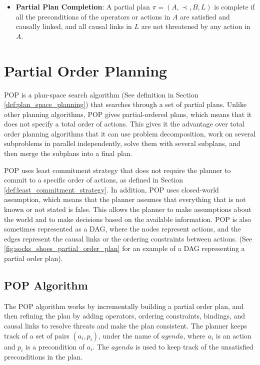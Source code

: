 \begin{itemize}
      \item  \label{def:partial_plan_completion}
            \textbf{Partial Plan Completion}: A partial plan $\pi = (A, \prec, B, L)$ is complete if all the preconditions of the operators or actions in $A$ are satisfied and causally linked, and all causal links in $L$ are not threatened by any action in $A$.

\end{itemize}








\section{Partial Order Planning} \label{sec:partial_order_planning}
\acf{POP} is a plan-space search algorithm (See definition in Section \ref{def:plan_space_planning}) that searches through a set of partial plans.
Unlike other planning algorithms, \ac{POP} gives partial-ordered plans, which means that it does not specify a total order of actions.
This gives it the advantage over total order planning algorithms that it can use problem decomposition, work
on several subproblems in parallel independently, solve them with several subplans, and then merge the subplans into a final plan.


\ac{POP} uses least commitment strategy that does not require the planner to commit to a specific order of actions, as defined in Section \ref{def:least_commitment_strategy}. In addition, \ac{POP} uses closed-world assumption, which means that the planner assumes that everything that is not known or not stated is false. This allows the planner to make assumptions about the world and to make decisions based on the available information.
\ac{POP} is also sometimes represented as a \acf{DAG}, where the nodes represent actions, and the edges represent the causal links or the ordering constraints between actions. (See \autoref{fig:socks_shoes_partial_order_plan} for an example of a \ac{DAG} representing a partial order plan).

\subsection{POP Algorithm} \label{subsec:pop_algorithm}
The \acf{POP} algorithm works by incrementally building a partial order plan, and then refining the plan by adding operators, ordering constraints,
bindings, and causal links to resolve threats and make the plan consistent.
The planner keeps track of a set of pairs $(a_i, p_i)$, under the name of $agenda$, where $a_i$ is an action and $p_i$ is a precondition of $a_i$. The $agenda$ is used to keep track of the unsatisfied preconditions in the plan.


